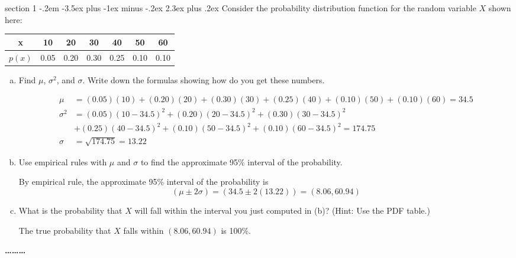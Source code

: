 \documentclass[answers,11pt]{exam}
\makeatletter
\newenvironment{problem}{\@startsection
       {section}
       {1}
       {-.2em}
       {-3.5ex plus -1ex minus -.2ex}
       {2.3ex plus .2ex}
       {\pagebreak[3]%
       \large\bf\noindent{Problem }
       }
       }
       {%
       \begin{center}\large\bf \ldots\ldots\ldots\end{center}}
\makeatother
\begin{document}
\begin{problem}{}
Consider the probability distribution function for the random variable $X$ shown here:
\begin{center}
\begin{tabular}{|c|c|c|c|c|c|c|} \hline
x & 10& 20 &30 &40 &50 &60 \\ \hline
$p(x)$ & 0.05&0.20 &0.30 & 0.25&0.10 &0.10 \\ \hline
\end{tabular}
\end{center}
\begin{enumerate}[(a)]
\item Find $\mu$, $\sigma^2$, and $\sigma$. Write down the formulas showing how do you get these numbers.
\begin{solution}
\begin{align*}
\mu&=(0.05)(10)+(0.20)(20) + (0.30)(30) + (0.25)(40)+(0.10)(50)+(0.10)(60)=34.5\\
\sigma^2&=(0.05)(10-34.5)^2+(0.20)(20-34.5)^2 + (0.30)(30-34.5)^2 \\
&+ (0.25)(40-34.5)^2+(0.10)(50-34.5)^2+(0.10)(60-34.5)^2=174.75\\
\sigma&=\sqrt{174.75}=13.22
\end{align*}
\end{solution}
\item Use empirical rules with $\mu$ and $\sigma$ to find the approximate 95\% interval of the probability.
\begin{solution}
By empirical rule, the approximate 95\% interval of the probability is 
$$ (\mu \pm 2\sigma) = (34.5\pm 2(13.22)) = (8.06,60.94)
$$
\end{solution}
\item What is the probability that $X$ will fall within the interval you just computed in (b)? (Hint: Use the PDF table.)
\begin{solution}
The true probability that $X$ falls within $(8.06,60.94)$ is 100\%.
\end{solution}

\end{enumerate}
\end{problem}
\end{document}
